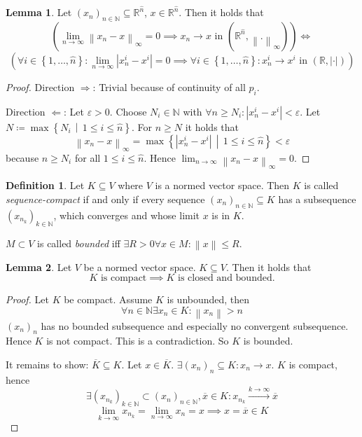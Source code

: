 \documentclass[a4paper,landscape,twocolumn]{article}
\theoremstyle{definition}
\newtheorem{defi}{Definition}
\newtheorem{lemma}{Lemma}
\newcommand\set[1]{\left\{#1\right\}}
\newcommand\setdef[2]{\left\{#1\,\middle|\,#2\right\}}
\newcommand\abs[1]{\left|#1\right|}
\newcommand\norm[1]{\left\|#1\right\|}
\newcommand\inorm[1]{\left\|#1\right\|_\infty}
\begin{document}
\begin{lemma}
  Let $(x_n)_{n\in\mathbb N} \subseteq \mathbb R^{\hat{n}}$, $x \in \mathbb R^{\hat{n}}$.
  Then it holds that
  \[
  \left(\lim_{n\to\infty} \inorm{x_n - x} = 0 \implies x_n \to x \text{ in } (\mathbb R^{\hat{n}}, \inorm{.})\right) \iff \]
  \[
  \left(\forall i \in \set{1, \ldots, \hat n}: \lim_{n\to\infty} \abs{x_n^i - x^i} = 0 \implies \forall i \in \set{1, \ldots, \hat n}: x_n^i \to x^i \text{ in } (\mathbb R, \abs{\cdot})\right)
  \]
\end{lemma}
\begin{proof}
  Direction $\Rightarrow$: Trivial because of continuity of all $p_i$.

  Direction $\Leftarrow$: Let $\varepsilon > 0$.
  Choose $N_i \in \mathbb N$ with $\forall n \geq N_i: \abs{x_n^i - x^i} < \varepsilon$.
  Let $N \coloneqq \max\setdef{N_i}{1 \leq i \leq \hat n}$. For $n \geq N$ it holds that
  \[ \inorm{x_n - x} = \max\setdef{\abs{x_n^i - x^i}}{1 \leq i \leq \hat n} < \varepsilon \]
  because $n \geq N_i$ for all $1 \leq i \leq \hat n$. Hence $\lim_{n\to\infty} \inorm{x_n - x} = 0$.
\end{proof}

\begin{defi}
  Let $K \subseteq V$ where $V$ is a normed vector space. Then $K$ is called \emph{sequence-compact} if and only if every sequence $(x_n)_{n\in\mathbb N} \subseteq K$ has a subsequence $(x_{n_k})_{k \in \mathbb N}$, which converges and whose limit $x$ is in $K$.

  $M \subset V$ is called \emph{bounded} iff $\exists R > 0 \forall x \in M: \norm{x} \leq R$.
\end{defi}

\begin{lemma}
  Let $V$ be a normed vector space. $K \subseteq V$. Then it holds that
  \[ K \text{ is compact} \implies K \text{ is closed and bounded}. \]
\end{lemma}
\begin{proof}
  Let $K$ be compact. Assume $K$ is unbounded, then
  \[ \forall n \in \mathbb N \exists x_n \in K: \norm{x_n} > n \]
  $(x_n)_n$ has no bounded subsequence and especially no convergent subsequence.
Hence $K$ is not compact. This is a contradiction. So $K$ is bounded.

  It remains to show: $\overline{K} \subseteq K$. Let $x \in \overline{K}$.
  $\exists (x_n)_n \subseteq K: x_n \to x$. $K$ is compact, hence
  \[ \exists (x_{n_k})_{k\in\mathbb N} \subset (x_n)_{n\in\mathbb N}, \overline{x} \in K: x_{n_k} \overset{k \to \infty}{\longrightarrow} \overline{x} \]
  \[ \lim_{k\to\infty} x_{n_k} = \lim_{n\to\infty} x_n = x \implies x = \overline{x} \in K \]
\end{proof}

  

\clearpage
\begin{otherlanguage}{ngerman}
\printindex[German]
\end{otherlanguage}
\printindex[English]
\end{document}
